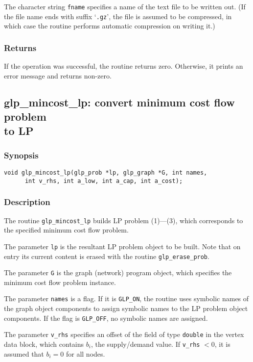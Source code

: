 The character string \verb|fname| specifies a name of the text file to
be written out. (If the file name ends with suffix `\verb|.gz|', the
file is assumed to be compressed, in which case the routine performs
automatic compression on writing it.)

\subsubsection*{Returns}

If the operation was successful, the routine returns zero. Otherwise,
it prints an error message and returns non-zero.

\newpage

\subsection{glp\_mincost\_lp: convert minimum cost flow problem\\to LP}

\subsubsection*{Synopsis}

\begin{verbatim}
void glp_mincost_lp(glp_prob *lp, glp_graph *G, int names,
      int v_rhs, int a_low, int a_cap, int a_cost);
\end{verbatim}

\subsubsection*{Description}

The routine \verb|glp_mincost_lp| builds LP problem (1)---(3), which
corresponds to the specified minimum cost flow problem.

The parameter \verb|lp| is the resultant LP problem object to be built.
Note that on entry its current content is erased with the routine
\verb|glp_erase_prob|.

The parameter \verb|G| is the graph (network) program object, which
specifies the minimum cost flow problem instance.

The parameter \verb|names| is a flag. If it is \verb|GLP_ON|, the
routine uses symbolic names of the graph object components to assign
symbolic names to the LP problem object components. If the flag is
\verb|GLP_OFF|, no symbolic names are assigned.

The parameter \verb|v_rhs| specifies an offset of the field of type
\verb|double| in the vertex data block, which contains $b_i$, the
supply/demand value. If \verb|v_rhs| $<0$, it is assumed that $b_i=0$
for all nodes.

